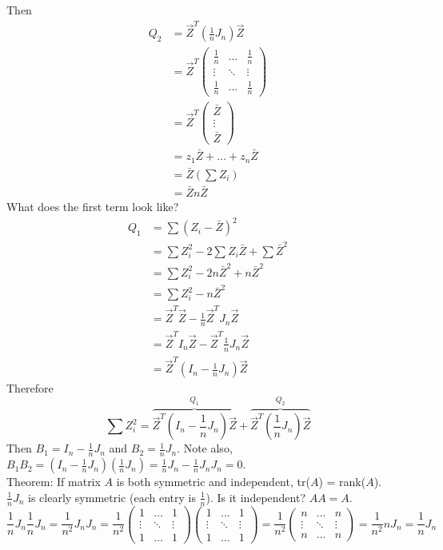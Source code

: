 \documentclass[12pt]{article}
\begin{document}
Then $$ \begin{aligned} Q_2 &= \vec{Z}^T(\frac{1}{n}J_n)\vec{Z} \\ &= \vec{Z}^T \begin{pmatrix} \frac{1}{n} & \dots & \frac{1}{n} \\ \vdots & \ddots & \vdots \\ \frac{1}{n} & \dots & \frac{1}{n} \end{pmatrix} \\ &= \vec{Z}^T \begin{pmatrix} \bar{Z} \\ \vdots \\ \bar{Z} \end{pmatrix} \\ &= z_1\bar{Z} + \dots + z_n\bar{Z} \\ &= \bar{Z}(\sum Z_i) \\ &= \bar{Z}n\bar{Z} \end{aligned} $$ 
What does the first term look like? $$ \begin{aligned} Q_1 &= \sum (Z_i - \bar{Z})^2 \\ &= \sum Z_i^2 - 2\sum Z_i \bar{Z} + \sum \bar{Z}^2 \\ &= \sum Z_i^2 - 2n\bar{Z}^2 + n\bar{Z}^2 \\ &= \sum Z_i^2 - n\bar{Z}^2 \\ &= \vec{Z}^T\vec{Z} - \frac{1}{n}\vec{Z}^TJ_n\vec{Z} \\ &= \vec{Z}^TI_n\vec{Z} - \vec{Z}^T\frac{1}{n}J_n\vec{Z} \\ &= \vec{Z}^T(I_n - \frac{1}{n}J_n)\vec{Z} \end{aligned} $$ 
Therefore $$ \sum Z_i^2 = \overbrace{\vec{Z}^T(I_n - \frac{1}{n}J_n)\vec{Z}}^{Q_1} + \overbrace{\vec{Z}^T(\frac{1}{n}J_n)\vec{Z}}^{Q_2} $$ 
Then $B_1 = I_n - \frac{1}{n}J_n$ and $B_2 = \frac{1}{n}J_n$. Note also, $B_1B_2 = (I_n - \frac{1}{n}J_n)(\frac{1}{n}J_n) = \frac{1}{n}J_n - \frac{1}{n}J_nJ_n = 0$. \\
Theorem: If matrix $A$ is both symmetric and independent, tr($A$) = rank($A$). \\
$\frac{1}{n}J_n$ is clearly symmetric (each entry is $\frac{1}{n}$). Is it independent? $AA = A$. 
$$ \frac{1}{n}J_n \frac{1}{n}J_n = \frac{1}{n^2}J_nJ_n = \frac{1}{n^2} \begin{pmatrix} 1 & \dots & 1 \\ \vdots & \ddots & \vdots \\ 1 & \dots & 1 \end{pmatrix} \begin{pmatrix} 1 & \dots & 1 \\ \vdots & \ddots & \vdots \\ 1 & \dots & 1 \end{pmatrix}  = \frac{1}{n^2} \begin{pmatrix} n & \dots & n \\ \vdots & \ddots & \vdots \\ n & \dots & n \end{pmatrix} = \frac{1}{n^2}nJ_n = \frac{1}{n}J_n $$ 
\end{document}
